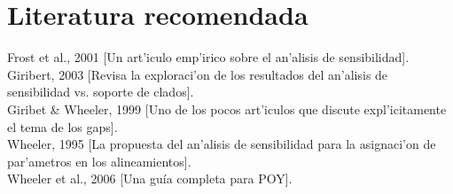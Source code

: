 \section{Literatura recomendada}
\noindent
Frost et al., 2001 [Un art'iculo emp'irico sobre el an'alisis de sensibilidad].\\
Giribert, 2003 [Revisa la exploraci'on de los resultados del an'alisis de sensibilidad vs. soporte de clados].\\
Giribet \& Wheeler, 1999 [Uno de los pocos art'iculos que discute expl'icitamente el tema de los gaps].\\
Wheeler, 1995 [La propuesta del an'alisis de sensibilidad para la asignaci'on de par'ametros en los alineamientos].\\
Wheeler et al., 2006 [Una gu\'ia completa para POY].